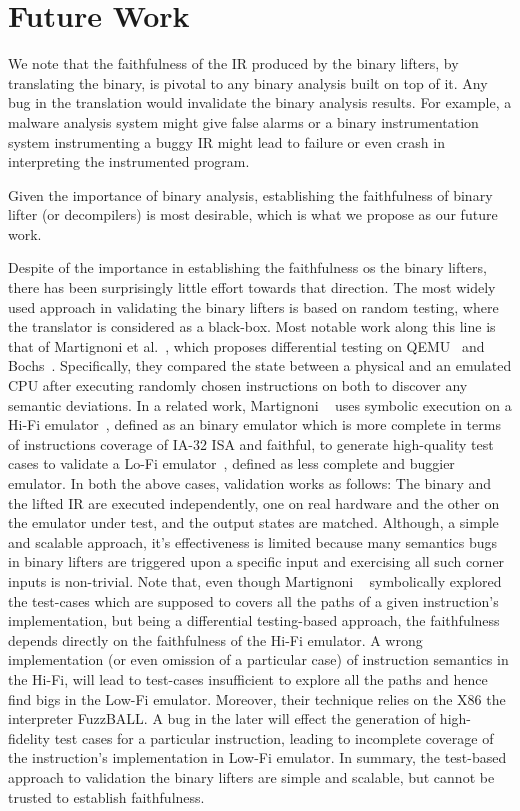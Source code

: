 \section{Future Work}\label{sec:problem}

We note that the faithfulness of the IR produced by the binary lifters, by
translating the binary, is pivotal to any binary analysis built on top of it.
Any bug in the translation would invalidate the binary analysis results. For
example, a malware analysis system might give false alarms or a binary
instrumentation system instrumenting a buggy IR might lead to failure or even
crash in interpreting the instrumented program. 

Given the importance of binary analysis, establishing the faithfulness of
binary lifter (or decompilers) is most desirable, which is what we propose as
our future work.

Despite of the importance in establishing the faithfulness os the binary lifters,
there has been surprisingly little effort towards that direction. 
%
The most widely used approach in validating the binary lifters is based on random testing, where the translator is considered as a black-box. Most notable work along this line  is that of Martignoni et al.~\cite{Martignoni:ISSTA2009, Martignoni:ISSTA2010}, which
 proposes differential testing on QEMU~\cite{QEMU:USENIX05} and Bochs~\cite{Bochs1996}.
Specifically, they compared the state between a physical and an emulated CPU
after executing randomly chosen instructions on both to discover any semantic
deviations. In a related work, Martignoni \etal~\cite{Martignoni:ASPLOS2012} uses symbolic execution on a Hi-Fi emulator~\cite{Bochs1996}, defined as an binary emulator which is more complete in terms of instructions coverage of IA-32 ISA and faithful, to generate high-quality test cases to validate  a Lo-Fi emulator~\cite{QEMU:USENIX05}, defined as  less complete and buggier emulator. In both the above cases, validation works as follows: The binary and the lifted IR are executed independently, one on real hardware and the other on the emulator under test, and the output states are matched. Although, a simple and scalable approach, it's effectiveness is limited because many semantics bugs in binary lifters are triggered upon a specific input and exercising all such corner inputs is non-trivial. Note that, even though Martignoni \etal~\cite{Martignoni:ASPLOS2012} symbolically explored the test-cases which are supposed to covers all the paths of a given instruction's implementation, but being a differential testing-based approach, the faithfulness depends directly on  the faithfulness of the Hi-Fi emulator. A wrong implementation (or even omission of a particular case) of instruction semantics in the Hi-Fi, will lead to test-cases insufficient to explore all the paths and hence find bigs in the Low-Fi emulator. Moreover, their technique relies on the X86 the interpreter FuzzBALL. A bug in the later will effect the generation of high-fidelity test cases for a particular instruction, leading to incomplete coverage of the instruction's implementation in Low-Fi emulator. In summary, the test-based approach to validation the binary lifters are simple and scalable, but cannot be trusted to establish faithfulness.     

